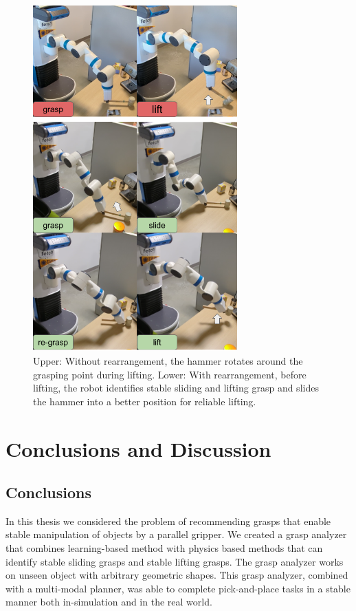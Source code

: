 \documentclass[12pt]{ucsddissertation}
\begin{document}
\begin{figure}
	\centering
	\includegraphics[width=0.7\textwidth]{figures/hammer_real_world.png}
	\caption[Example of an object during real world experiments]{ Upper: Without rearrangement, the hammer rotates around the grasping point during lifting. Lower: With rearrangement, before lifting, the robot identifies stable sliding and lifting grasp and slides the hammer into a better position for reliable lifting.}
	\label{fig:real_world_hammer}
\end{figure}

\chapter{Conclusions and Discussion}
\section{Conclusions}
In this thesis we considered the problem of recommending grasps that enable stable manipulation of objects by a parallel gripper. We created a grasp analyzer that combines learning-based method with physics based methods that can identify stable sliding grasps and stable lifting grasps. The grasp analyzer works on unseen object with arbitrary geometric shapes. This grasp analyzer, combined with a multi-modal planner, was able to complete pick-and-place tasks in a stable manner both in-simulation and in the real world. 
\end{document}
